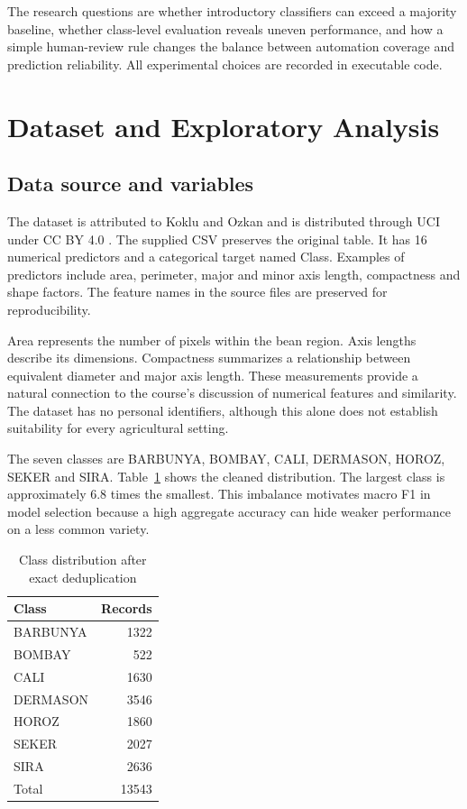 \documentclass[conference]{IEEEtran}
\begin{document}
The research questions are whether introductory classifiers can exceed a majority baseline, whether class-level evaluation reveals uneven performance, and how a simple human-review rule changes the balance between automation coverage and prediction reliability. All experimental choices are recorded in executable code.
\section{Dataset and Exploratory Analysis}
\subsection{Data source and variables}
The dataset is attributed to Koklu and Ozkan and is distributed through UCI under CC BY 4.0 \cite{uci}. The supplied CSV preserves the original table. It has 16 numerical predictors and a categorical target named Class. Examples of predictors include area, perimeter, major and minor axis length, compactness and shape factors. The feature names in the source files are preserved for reproducibility.

Area represents the number of pixels within the bean region. Axis lengths describe its dimensions. Compactness summarizes a relationship between equivalent diameter and major axis length. These measurements provide a natural connection to the course's discussion of numerical features and similarity. The dataset has no personal identifiers, although this alone does not establish suitability for every agricultural setting.

The seven classes are BARBUNYA, BOMBAY, CALI, DERMASON, HOROZ, SEKER and SIRA. Table~\ref{tab:counts} shows the cleaned distribution. The largest class is approximately 6.8 times the smallest. This imbalance motivates macro F1 in model selection because a high aggregate accuracy can hide weaker performance on a less common variety.
\begin{table}[ht]\caption{Class distribution after exact deduplication}\label{tab:counts}\centering
\begin{tabular}{lr}\hline Class & Records\\\hline
BARBUNYA &1322\\ BOMBAY &522\\ CALI &1630\\ DERMASON &3546\\ HOROZ &1860\\ SEKER &2027\\ SIRA &2636\\\hline Total &13543\\\hline\end{tabular}\end{table}
\end{document}

